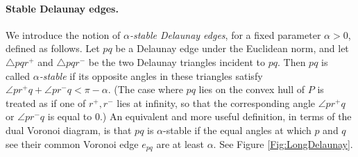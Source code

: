 \documentclass[letter,11pt]{article}
\begin{document}
\paragraph{Stable Delaunay edges.} 
We introduce the notion of \textit{$\alpha$-stable Delaunay edges}, 
for a fixed parameter $\alpha>0$, defined as follows.  Let $pq$ be 
a Delaunay edge under the Euclidean norm, and let $\triangle pqr^+$ and $\triangle pqr^-$ 
be the two Delaunay triangles incident to $pq$.  Then $pq$ is 
called {\em $\alpha$-stable} if its opposite angles in these triangles
satisfy $\angle pr^+q + \angle pr^-q < \pi-\alpha$. (The case where
$pq$ lies on the convex hull of $P$ is treated as if one of $r^+,r^-$ 
lies at infinity, so that the corresponding angle $\angle pr^+q$ or 
$\angle pr^-q$ is equal to $0$.) An equivalent and more useful definition, in terms of the dual Voronoi diagram, is that 
$pq$ is $\alpha$-stable if the equal angles at which $p$ and $q$ 
see their common Voronoi edge $e_{pq}$ are at least $\alpha$.
See Figure \ref{Fig:LongDelaunay}.
\end{document}
